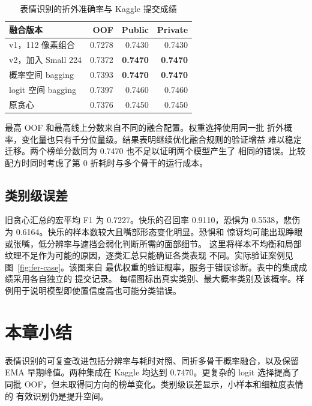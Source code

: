 \begin{table}[H]
\centering\small
\caption{表情识别的折外准确率与 Kaggle 提交成绩}\label{tab:fer-results}
\begin{tabularx}{\linewidth}{@{}Yrrr@{}}
\toprule
融合版本 & OOF & Public & Private \\
\midrule
v1，112 像素组合 & 0.7278 & 0.7430 & 0.7430 \\
v2，加入 Small 224 & 0.7372 & \textbf{0.7470} & \textbf{0.7470} \\
概率空间 bagging & 0.7393 & \textbf{0.7470} & \textbf{0.7470} \\
logit 空间 bagging & 0.7397 & 0.7460 & 0.7460 \\
原贪心 & 0.7376 & 0.7450 & 0.7450 \\
\bottomrule
\end{tabularx}
\end{table}

最高 OOF 和最高线上分数来自不同的融合配置。权重选择使用同一批
折外概率，变化量也只有千分位量级。结果表明继续优化融合规则的验证增益
难以稳定迁移。两个榜单分数同为 0.7470 也不足以证明两个模型产生了
相同的错误。比较配方时同时考虑了第 0 折耗时与多个骨干的运行成本。

\clearpage
\subsection{类别级误差}
旧贪心汇总的宏平均 F1 为 0.7227。快乐的召回率 0.9110，恐惧为
0.5538，悲伤为 0.6164。快乐的样本数较大且嘴部形态变化明显。恐惧和
惊讶均可能出现睁眼或张嘴，低分辨率与遮挡会弱化判断所需的面部细节。
这里将样本不均衡和局部纹理不足作为可能的原因，逐类汇总只能确证各类表现
不同。\ifLocalReport 实际验证案例见图~\ref{fig:fer-case}。该图来自 
最优权重的验证概率，服务于错误诊断。表中的集成成绩采用各自独立的
提交记录。\fi
{}
{每幅图标出真实类别、最大概率类别及该概率。样例用于说明模型即使置信度高也可能分类错误。}

\section{本章小结}
表情识别的可复查改进包括分辨率与耗时对照、同折多骨干概率融合，以及保留 EMA
早期峰值。两种集成在 Kaggle 均达到 0.7470。更复杂的 logit 选择提高了
同批 OOF，但未取得同方向的榜单变化。类别级误差显示，小样本和细粒度表情的
有效识别仍是提升空间。
